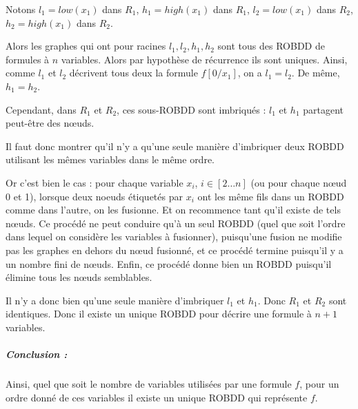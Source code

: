 \documentclass[12pt]{article}
\begin{document}
Notons $l_1 = low(x_1)$ dans $R_1$,  $h_1 = high(x_1)$ dans $R_1$, $l_2 = low(x_1)$ dans $R_2$,  $h_2 = high(x_1)$ dans $R_2$.

Alors les graphes qui ont pour racines $l_1, l_2, h_1, h_2$ sont tous des ROBDD de formules à $n$ variables. Alors par hypothèse de récurrence ils sont uniques. Ainsi, comme $l_1$ et $l_2$ décrivent tous deux la formule $f[0/x_1]$, on a $l_1=l_2$. De même, $h_1=h_2$.

Cependant, dans $R_1$ et $R_2$, ces sous-ROBDD sont imbriqués : $l_1$ et $h_1$ partagent peut-être des n\oe uds.

Il faut donc montrer qu'il n'y a qu'une seule manière d'imbriquer deux ROBDD utilisant les mêmes variables dans le même ordre.

Or c'est bien le cas : pour chaque variable $x_i$, $i\in[2\dots n]$ (ou pour chaque n\oe ud 0 et 1), lorsque deux noeuds étiquetés par $x_i$ ont les même fils dans un ROBDD comme dans l'autre, on les fusionne. Et on recommence tant qu'il existe de tels n\oe uds. Ce procédé ne peut conduire qu'à un seul ROBDD (quel que soit l'ordre dans lequel on considère les variables à fusionner), puisqu'une fusion ne modifie pas les graphes en dehors du n\oe ud fusionné, et ce procédé termine puisqu'il y a un nombre fini de n\oe uds. Enfin, ce procédé donne bien un ROBDD puisqu'il élimine tous les n\oe uds semblables.

Il n'y a donc bien qu'une seule manière d'imbriquer $l_1$ et $h_1$. Donc $R_1$ et $R_2$ sont identiques. Donc il existe un unique ROBDD pour décrire une formule à $n+1$ variables.

\subparagraph{Conclusion :} Ainsi, quel que soit le nombre de variables utilisées par une formule $f$, pour un ordre donné de ces variables il existe un unique ROBDD qui représente $f$.
\end{document}

